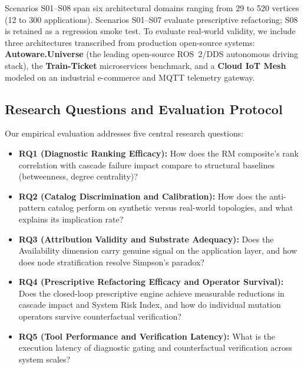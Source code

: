 Scenarios S01--S08 span six architectural domains ranging from 29 to 520 vertices (12 to 300 applications). Scenarios S01--S07 evaluate prescriptive refactoring; S08 is retained as a regression smoke test. To evaluate real-world validity, we include three architectures transcribed from production open-source systems: \textbf{Autoware.Universe} (the leading open-source ROS~2/DDS autonomous driving stack), the \textbf{Train-Ticket} microservices benchmark, and a \textbf{Cloud IoT Mesh} modeled on an industrial e-commerce and MQTT telemetry gateway.

\subsection{Research Questions and Evaluation Protocol}
\label{sec:exp:protocol}

Our empirical evaluation addresses five central research questions:
\begin{itemize}
    \item \textbf{RQ1 (Diagnostic Ranking Efficacy):} How does the RM composite's rank correlation with cascade failure impact compare to structural baselines (betweenness, degree centrality)?
    \item \textbf{RQ2 (Catalog Discrimination and Calibration):} How does the anti-pattern catalog perform on synthetic versus real-world topologies, and what explains its implication rate?
    \item \textbf{RQ3 (Attribution Validity and Substrate Adequacy):} Does the Availability dimension carry genuine signal on the application layer, and how does node stratification resolve Simpson's paradox?
    \item \textbf{RQ4 (Prescriptive Refactoring Efficacy and Operator Survival):} Does the closed-loop prescriptive engine achieve measurable reductions in cascade impact and System Risk Index, and how do individual mutation operators survive counterfactual verification?
    \item \textbf{RQ5 (Tool Performance and Verification Latency):} What is the execution latency of diagnostic gating and counterfactual verification across system scales?
\end{itemize}

